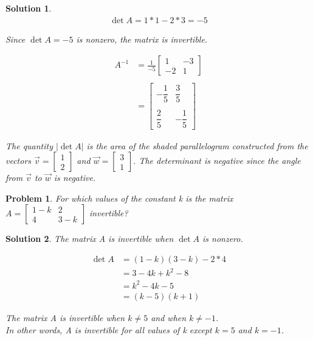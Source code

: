 \documentclass{article}
\newtheorem{problem}{Problem}
\newtheorem*{solution}{Solution}
\begin{document}
\begin{solution}
\begin{align*}
\det A = 1*1 - 2*3 = -5
\end{align*}

Since $\det A = -5$ is nonzero, the matrix is invertible. 

\begin{align*}
A^{-1} &= \displaystyle \frac{1}{-5} \begin{bmatrix}1 & -3 \\ -2 & 1\end{bmatrix} \\ \\
&= \begin{bmatrix}-\dfrac{1}{5} & \dfrac{3}{5} \\ \\ \dfrac{2}{5} & -\dfrac{1}{5}\end{bmatrix}
\end{align*}

The quantity $\lvert \det A \rvert$ is the area of the shaded parallelogram constructed from the vectors $\vec{v} = \begin{bmatrix} 1 \\ 2 \end{bmatrix}$ and $\vec{w} = \begin{bmatrix}3 \\ 1 \end{bmatrix}$. The determinant is negative since the angle from $\vec{v}$ to $\vec{w}$ is negative.

\end{solution}

\begin{problem}
For which values of the constant k is the matrix $A = \begin{bmatrix} 1-k & 2 \\ 4 & 3-k \end{bmatrix}$ invertible?
\end{problem}

\begin{solution}
The matrix A is invertible when $\det A$ is nonzero.

\begin{align*}
\det A &= (1-k)(3-k) - 2*4 \\
&= 3 - 4k+ k^2 - 8 \\
&= k^2 - 4k - 5 \\
&= (k - 5)(k + 1)
\end{align*} 

The matrix A is invertible when $k \neq 5$ and when $k \neq -1$. \\

In other words, A is invertible for all values of k except $k = 5$ and $k = -1$.
\end{solution}
\end{document}
